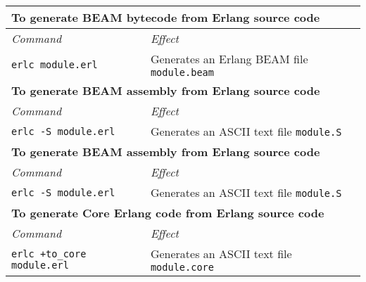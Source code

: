 \begin{table}[h]

\centering

\renewcommand*{\arraystretch}{1.5}

\begin{tabular}{|l|l|}
\hline%
\multicolumn{2}{|l|}{%
  \textbf{To generate BEAM bytecode from Erlang source code}%
}\\\hline%
\emph{Command} & \emph{Effect} \\\hline
  \lstinline[]!erlc module.erl! &%
  Generates an Erlang BEAM file \texttt{module.beam}
\\\hline%
\multicolumn{2}{|l|}{%
  \textbf{To generate BEAM assembly from Erlang source code}%
}\\\hline%
\emph{Command} & \emph{Effect} \\\hline
  \lstinline[]!erlc -S module.erl! &%
  Generates an ASCII text file \texttt{module.S}
\\\hline%
\multicolumn{2}{|l|}{%
  \textbf{To generate BEAM assembly from Erlang source code}%
}\\\hline%
\emph{Command} & \emph{Effect} \\\hline
  \lstinline[]!erlc -S module.erl! &%
  Generates an ASCII text file \texttt{module.S}
\\\hline%
\multicolumn{2}{|l|}{%
  \textbf{To generate Core Erlang code from Erlang source code}%
}\\\hline%
\emph{Command} & \emph{Effect} \\\hline
  \lstinline[]!erlc +to_core module.erl! &%
  Generates an ASCII text file \texttt{module.core}
\\\hline%
\end{tabular}

\end{table}

